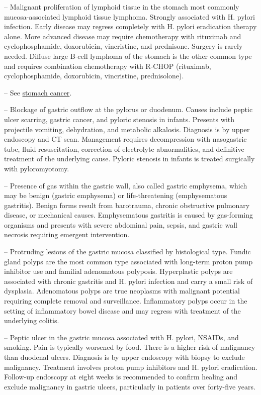 -- Malignant proliferation of lymphoid tissue in the stomach most commonly mucosa-associated lymphoid tissue lymphoma. Strongly associated with H. pylori infection. Early disease may regress completely with H. pylori eradication therapy alone. More advanced disease may require chemotherapy with rituximab and cyclophosphamide, doxorubicin, vincristine, and prednisone. Surgery is rarely needed. Diffuse large B-cell lymphoma of the stomach is the other common type and requires combination chemotherapy with R-CHOP (rituximab, cyclophosphamide, doxorubicin, vincristine, prednisolone).

-- See \hyperlink{Stomach Cancer}{stomach cancer}.

-- Blockage of gastric outflow at the pylorus or duodenum. Causes include peptic ulcer scarring, gastric cancer, and pyloric stenosis in infants. Presents with projectile vomiting, dehydration, and metabolic alkalosis. Diagnosis is by upper endoscopy and CT scan. Management requires decompression with nasogastric tube, fluid resuscitation, correction of electrolyte abnormalities, and definitive treatment of the underlying cause. Pyloric stenosis in infants is treated surgically with pyloromyotomy.

-- Presence of gas within the gastric wall, also called gastric emphysema, which may be benign (gastric emphysema) or life-threatening (emphysematous gastritis). Benign forms result from barotrauma, chronic obstructive pulmonary disease, or mechanical causes. Emphysematous gastritis is caused by gas-forming organisms and presents with severe abdominal pain, sepsis, and gastric wall necrosis requiring emergent intervention.

-- Protruding lesions of the gastric mucosa classified by histological type. Fundic gland polyps are the most common type associated with long-term proton pump inhibitor use and familial adenomatous polyposis. Hyperplastic polyps are associated with chronic gastritis and H. pylori infection and carry a small risk of dysplasia. Adenomatous polyps are true neoplasms with malignant potential requiring complete removal and surveillance. Inflammatory polyps occur in the setting of inflammatory bowel disease and may regress with treatment of the underlying colitis.

-- Peptic ulcer in the gastric mucosa associated with H. pylori, NSAIDs, and smoking. Pain is typically worsened by food. There is a higher risk of malignancy than duodenal ulcers. Diagnosis is by upper endoscopy with biopsy to exclude malignancy. Treatment involves proton pump inhibitors and H. pylori eradication. Follow-up endoscopy at eight weeks is recommended to confirm healing and exclude malignancy in gastric ulcers, particularly in patients over forty-five years.

